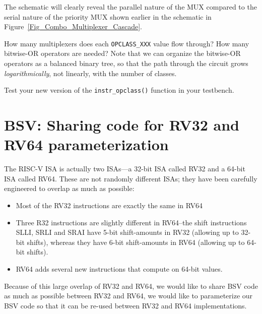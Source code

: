 The schematic will clearly reveal the parallel nature of the MUX
compared to the serial nature of the priority MUX shown earlier in the
schematic in Figure~\ref{Fig_Combo_Multiplexer_Cascade}.

How many multiplexers does each \verb|OPCLASS_XXX| value flow through?
How many bitwise-OR operators are needed?  Note that we can organize
the bitwise-OR operators as a balanced binary tree, so that the path
through the circuit grows \emph{logarithmically}, not linearly, with
the number of classes.

\Exercise

Test your new version of the \verb|instr_opclass()| function in your
testbench.

\Endexercise


\section{BSV: Sharing code for RV32 and RV64 {\via} parameterization}

\label{BSV_Paramterizing_XLEN}


The RISC-V ISA is actually two ISAs---a 32-bit ISA called RV32 and a
64-bit ISA called RV64.  These are not randomly different ISAs; they
have been carefully engineered to overlap as much as possible:

\begin{itemize}

\item Most of the RV32 instructions are exactly the same in RV64

\item Three R32 instructions are slightly different in RV64--the shift
instructions SLLI, SRLI and SRAI have 5-bit shift-amounts in RV32
(allowing up to 32-bit shifts), whereas they have 6-bit shift-amounts
in RV64 (allowing up to 64-bit shifts).

\item RV64 adds several new instructions that compute on 64-bit values.

\end{itemize}

Because of this large overlap of RV32 and RV64, we would like to share
BSV code as much as possible between RV32 and RV64, {\ie} we would
like to parameterize our BSV code so that it can be re-used between
RV32 and RV64 implementations.

